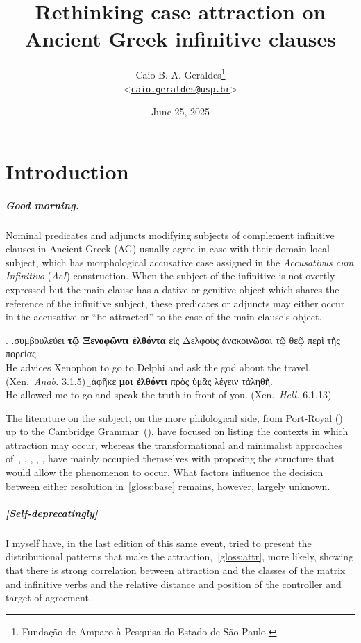\documentclass[a4paper, 12pt, article]{memoir}
\title{Rethinking case attraction on Ancient Greek infinitive clauses}
\author{
  Caio B. A. Geraldes\thanks{Fundação de Amparo à Pesquisa do Estado de São
  Paulo.}
	\\\smallskip
	<\href{mailto:caio.geraldes@usp.br}{\texttt{caio.geraldes@usp.br}}>
}
\date{June 25, 2025}
\begin{document}
\maketitle

\chapter{Introduction} %

\paragraph{Good morning.} 
Nominal predicates and adjuncts modifying subjects of complement infinitive
clauses in Ancient Greek (AG) usually agree in case with their domain local
subject, which has morphological accusative case assigned in the
\emph{Accusativus cum Infinitivo} (\emph{AcI}) construction.
When the subject of the infinitive is not overtly expressed but the main clause
has a dative or genitive object which shares the reference of the infinitive
subject, these predicates or adjuncts may either occur in the accusative or ``be
attracted'' to the case of the main clause's object.

\ex.\label{gloss:base}
\a.\label{gloss:noattr}συμβουλεύει \textbf{τῷ Ξενοφῶντι ἐλθόντα} {εἰς Δελφοὺς}
ἀνακοινῶσαι {τῷ θεῷ} {περὶ τῆς πορείας}.\\
He advices Xenophon to go to Delphi and ask the god about the travel.
(Xen.\ \emph{Anab.} 3.1.5)
\b.\label{gloss:attr}ἀφῆκε \textbf{μοι ἐλθόντι} {πρὸς ὑμᾶς} λέγειν τἀληθῆ.\\
He allowed me to go and speak the truth in front of you.
(Xen.\ \emph{Hell.} 6.1.13)


The literature on the subject, on the more philological side, from
Port\hyp{}Royal (\cite{Lancelot1658,Lancelot1709}) up to the Cambridge
Grammar~(\cite{Boas2019}), have focused on listing the contexts in which
attraction may occur, whereas the transformational and minimalist approaches
of~\textcite{Lakoff1970}, \textcite{Andrews1971}, \textcite{Quicoli1982},
\textcite{Spyropoulos2005}, \textcite{Tantalou2003},
\textcite{Sevdali2006,Sevdali2013} have mainly occupied themselves with
proposing the structure that would allow the phenomenon to occur.
What factors influence the decision between either resolution
in~\ref{gloss:base} remains, however, largely unknown.

\paragraph{[Self-deprecatingly]} I myself have, in the last edition of this
same event, tried to present the distributional patterns that make the
attraction,~\ref{gloss:attr}, more likely, showing that there is strong
correlation between attraction and the classes of the matrix and infinitive
verbs and the relative distance and position of the controller and target of
agreement.
\end{document}
